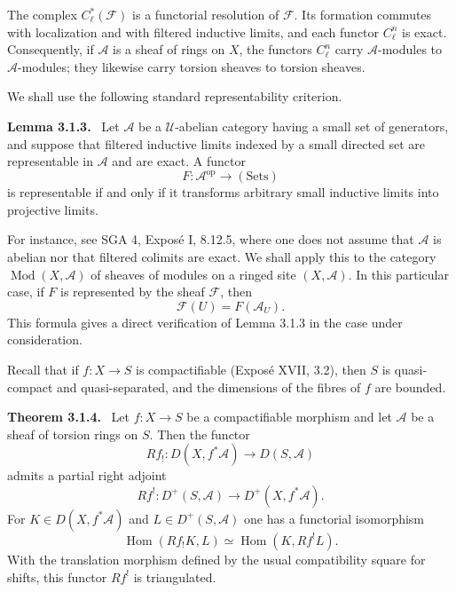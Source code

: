 \documentclass[12pt]{article}
\newcommand{\Aa}{\mathcal A}
\newcommand{\Ff}{\mathcal F}
\DeclareMathOperator{\Hom}{Hom}
\DeclareMathOperator{\Mod}{Mod}
\newcommand{\op}{\mathrm{op}}
\newenvironment{statement}[1]{\par\medskip\noindent\textbf{#1.}\ }{\par\medskip}
\begin{document}
The complex $C_\ell^*(\Ff)$ is a functorial resolution of $\Ff$. Its formation commutes with localization and with filtered inductive limits, and each functor $C_\ell^n$ is exact. Consequently, if $\Aa$ is a sheaf of rings on $X$, the functors $C_\ell^n$ carry $\Aa$-modules to $\Aa$-modules; they likewise carry torsion sheaves to torsion sheaves.

We shall use the following standard representability criterion.

\begin{statement}{Lemma 3.1.3}
Let $\Aa$ be a $\mathcal U$-abelian category having a small set of generators, and suppose that filtered inductive limits indexed by a small directed set are representable in $\Aa$ and are exact. A functor
\[
   F:\Aa^{\op}\longrightarrow (\mathrm{Sets})
\]
is representable if and only if it transforms arbitrary small inductive limits into projective limits.
\end{statement}

For instance, see SGA 4, Expos\'e I, 8.12.5, where one does not assume that $\Aa$ is abelian nor that filtered colimits are exact. We shall apply this to the category $\Mod(X,\Aa)$ of sheaves of modules on a ringed site $(X,\Aa)$. In this particular case, if $F$ is represented by the sheaf $\Ff$, then
\begin{equation}
   \Ff(U)=F(\Aa_U). \tag{3.1.3.1}
\end{equation}
This formula gives a direct verification of Lemma 3.1.3 in the case under consideration.

Recall that if $f:X\to S$ is compactifiable (Expos\'e XVII, 3.2), then $S$ is quasi-compact and quasi-separated, and the dimensions of the fibres of $f$ are bounded.

\begin{statement}{Theorem 3.1.4}
Let $f:X\to S$ be a compactifiable morphism and let $\Aa$ be a sheaf of torsion rings on $S$. Then the functor
\begin{equation}
   Rf_!:D(X,f^*\Aa)\longrightarrow D(S,\Aa) \tag{3.1.4.1}
\end{equation}
admits a partial right adjoint
\begin{equation}
   Rf^!:D^+(S,\Aa)\longrightarrow D^+(X,f^*\Aa). \tag{3.1.4.2}
\end{equation}
For $K\in D(X,f^*\Aa)$ and $L\in D^+(S,\Aa)$ one has a functorial isomorphism
\begin{equation}
   \Hom(Rf_!K,L)\simeq \Hom(K,Rf^!L). \tag{3.1.4.3}
\end{equation}
With the translation morphism defined by the usual compatibility square for shifts, this functor $Rf^!$ is triangulated.
\end{statement}
\end{document}

